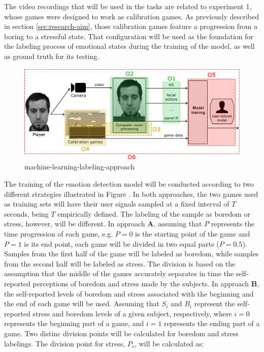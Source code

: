 The video recordings that will be used in the tasks are related to experiment 1, whose games were designed to work as calibration games. As previously described in section \ref{sec:research-aim}, those calibration games feature a progression from a boring to a stressful state. That configuration will be used as the foundation for the labeling process of emotional states during the training of the model, as well as ground truth for its testing.

\begin{figure}[h]
    \centering
    \includegraphics[width=\textwidth]{figures/components-objectives.png}
    \caption{machine-learning-labeling-approach}
    \label{fig:machine-learning-labeling-approach}
\end{figure}

The training of the emotion detection model will be conducted according to two different strategies illustrated in Figure \label{fig:machine-learning-labeling-approach}. In both approaches, the two games used as training sets will have their user signals sampled at a fixed interval of $T$ seconds, being $T$ empirically defined. The labeling of the sample as boredom or stress, however, will be different. In approach \textbf{A}, assuming that $P$ represents the time progression of each game, e.g. $P=0$ is the starting point of the game and $P=1$ is its end point, each game will be divided in two equal parts ($P=0.5$). Samples from the first half of the game will be labeled as boredom, while samples from the second half will be labeled as stress. The division is based on the assumption that the middle of the games accurately separates in time the self-reported perceptions of boredom and stress made by the subjects. In approach \textbf{B}, the self-reported levels of boredom and stress associated with the beginning and the end of each game will be used. Assuming that $S_i$ and $B_i$ represent the self-reported stress and boredom levels of a given subject, respectively, where $i=0$ represents the beginning part of a game, and $i=1$ represents the ending part of a game. Two distinc division points will be calculated for boredom and stress labelings. The division point for stress, $P_s$, will be calculated as:

